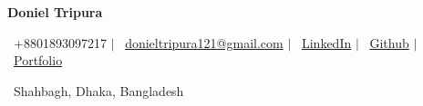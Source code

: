 \begin{center}
    {\Huge\textbf{Doniel Tripura}} \\  
    \small{
        \faPhone~+8801893097217 $\vert$
        \faEnvelope~\href{mailto:donieltripura121@gmail.com}{donieltripura121@gmail.com} $\vert$
        \faLinkedin~\href{https://www.linkedin.com/in/doniel-tripura-7a82281b9/}{LinkedIn} $\vert$
        \faGithub~\href{https://github.com/MachangDoniel}{Github} $\vert$
        \faGlobe~\href{https://machangdoniel.github.io/}{Portfolio}

    
    \faMapMarker~Shahbagh, Dhaka, Bangladesh}  
\end{center}
